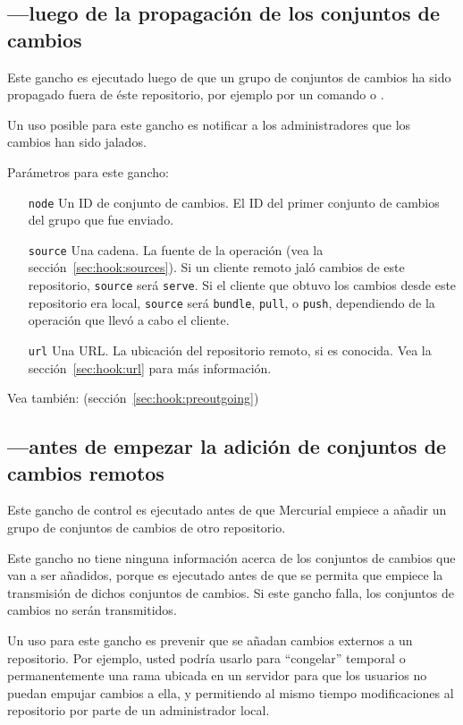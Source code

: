 \subsection{---luego de la propagación de los conjuntos
de cambios}
\label{sec:hook:outgoing}

Este gancho es ejecutado luego de que un grupo de conjuntos de cambios
ha sido propagado fuera de éste repositorio, por ejemplo por un
comando  o .

Un uso posible para este gancho es notificar a los administradores que
los cambios han sido jalados.

Parámetros para este gancho:
\begin{itemize}
\item[\texttt{node}] Un ID de conjunto de cambios. El ID del primer conjunto
  de cambios del grupo que fue enviado.
\item[\texttt{source}] Una cadena. La fuente de la operación (vea la
  sección~\ref{sec:hook:sources}).  Si un cliente remoto jaló cambios
  de este repositorio, \texttt{source} será \texttt{serve}.  Si el
  cliente que obtuvo los cambios desde este repositorio era local,
  \texttt{source} será \texttt{bundle}, \texttt{pull}, o
  \texttt{push}, dependiendo de la operación que llevó a cabo el
  cliente.
\item[\texttt{url}] Una URL. La ubicación del repositorio remoto, si
  es conocida. Vea la sección~\ref{sec:hook:url} para más información.
\end{itemize}

Vea también:  (sección~\ref{sec:hook:preoutgoing})

\subsection{---antes de empezar la adición de
conjuntos de cambios remotos}
\label{sec:hook:prechangegroup}

Este gancho de control es ejecutado antes de que Mercurial empiece a
añadir un grupo de conjuntos de cambios de otro repositorio.

Este gancho no tiene ninguna información acerca de los conjuntos de
cambios que van a ser añadidos, porque es ejecutado antes de que se
permita que empiece la transmisión de dichos conjuntos de cambios. Si
este gancho falla, los conjuntos de cambios no serán transmitidos.

Un uso para este gancho es prevenir que se añadan cambios externos a un
repositorio. Por ejemplo, usted podría usarlo para ``congelar''
temporal o permanentemente una rama ubicada en un servidor para que
los usuarios no puedan empujar cambios a ella, y permitiendo al mismo
tiempo modificaciones al repositorio por parte de un administrador
local.

